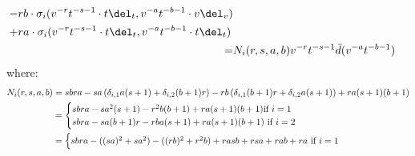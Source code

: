 \begin{example}
\begin{enumerate}
$$\begin{aligned}
\begin{aligned}
                                - & r b \cdot \sigma_i( v^{-r} t^{-s - 1} \cdot t \del_t, v^{-a} t^{-b - 1} \cdot v\del_v )
                                \\
                                + & r a \cdot \sigma_i( v^{-r} t^{-s - 1} \cdot t \del_t, v^{-a} t^{-b - 1} \cdot t \del_t )
                            \end{aligned}
                            \\
                            = & N_i(r, s, a, b) v^{-r} t^{-s - 1} \bar{d}( v^{-a} t^{-b - 1} )
                        \end{aligned}
                    $$
                where:
                    $$
                        \begin{aligned}
                            N_i(r, s, a, b) & = 
                            sbra
                            - sa \left( \delta_{i, 1} a(s + 1) + \delta_{i, 2} (b + 1) r \right) 
                            - rb \left( \delta_{i, 1} (b + 1) r + \delta_{i, 2} a (s + 1) \right)
                            + r a (s + 1) (b + 1)
                            \\
                            & = 
                            \begin{cases}
                                \text{$
                                    sbra
                                    - s a^2 (s + 1) 
                                    - r^2 b (b + 1)
                                    + r a (s + 1) (b + 1)
                                $if $i = 1$}
                                \\
                                \text{$
                                    sbra
                                    - sa (b + 1) r
                                    - rb a (s + 1)
                                    + r a (s + 1) (b + 1)
                                $ if $i = 2$}
                            \end{cases}
                            \\
                            & = 
                            \begin{cases}
                                \text{$
                                    sbra
                                    - ( (sa)^2 + s a^2 ) 
                                    - ( (rb)^2 + r^2 b ) 
                                    + rasb + rsa + rab + ra
                                $ if $i = 1$}
                                \\

\end{cases}
\end{aligned}$$
\end{enumerate}
\end{example}
